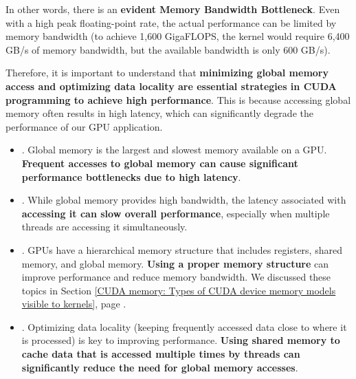 \highspace
In other words, there is an \textbf{evident Memory Bandwidth Bottleneck}. Even with a high peak floating-point rate, the actual performance can be limited by memory bandwidth (to achieve 1,600 GigaFLOPS, the kernel would require 6,400 GB/s of memory bandwidth, but the available bandwidth is only 600 GB/s).

\newpage

\noindent
Therefore, it is important to understand that \textbf{minimizing global memory access and optimizing data locality are essential strategies in CUDA programming to achieve high performance}. This is because accessing global memory often results in high latency, which can significantly degrade the performance of our GPU application.
\begin{itemize}
    \item {}. Global memory is the largest and slowest memory available on a GPU. \textbf{Frequent accesses to global memory can cause significant performance bottlenecks due to high latency}.
    
    \item {}. While global memory provides high bandwidth, the latency associated with \textbf{accessing it can slow overall performance}, especially when multiple threads are accessing it simultaneously.
    
    \item {}. GPUs have a hierarchical memory structure that includes registers, shared memory, and global memory. \textbf{Using a proper memory structure} can improve performance and reduce memory bandwidth. We discussed these topics in Section \ref{CUDA memory: Types of CUDA device memory models visible to kernels}, page \pageref{CUDA memory: Types of CUDA device memory models visible to kernels}.

    \item {}. Optimizing data locality (keeping frequently accessed data close to where it is processed) is key to improving performance. \textbf{Using shared memory to cache data that is accessed multiple times by threads can significantly reduce the need for global memory accesses}.
\end{itemize}
